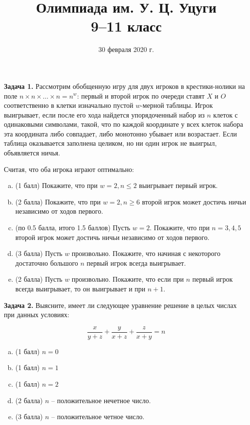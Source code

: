\documentclass[a4paper]{article}
\title{Олимпиада им. У. Ц. Уцуги \\ \Large 9--11 класс}
\date{30 февраля 2020 г.}
\begin{document}
	\maketitle

	\textbf{Задача 1.} Рассмотрим обобщенную игру для двух игроков в крестики-нолики на поле $n \times n \times \dots \times n = n^w$: первый и второй игрок по очереди ставят $X$ и $O$ соответственно в клетки изначально пустой $w$-мерной таблицы. Игрок выигрывает, если после его хода найдется упорядоченный набор из $n$ клеток с одинаковыми символами, такой, что по каждой координате у всех клеток набора эта координата либо совпадает, либо монотонно убывает или возрастает. Если таблица оказывается заполнена целиком, но ни один игрок не выигрыл, объявляется ничья.

	Считая, что оба игрока играют оптимально:

	\begin{enumerate}[a)]
		\item (1 балл) Покажите, что при $w = 2, n \le 2$ выигрывает первый игрок.
		\item (2 балла) Покажите, что при $w = 2, n \ge 6$ второй игрок может достичь ничьи независимо от ходов первого.
		\item (по 0.5 балла, итого 1.5 баллов) Пусть $w = 2$. Покажите, что при $n = 3, 4, 5$ второй игрок может достичь ничьи независимо от ходов первого.
		\item (3 балла) Пусть $w$ произвольно. Покажите, что начиная с некоторого достаточно большого $n$ первый игрок всегда выигрывает.
		\item (2 балла) Пусть $w$ произвольно. Покажите, что если при $n$ первый игрок всегда выигрывает, то он выигрывает и при $n+1$.
	\end{enumerate}


	\textbf{Задача 2.} Выясните, имеет ли следующее уравнение решение в целых числах при данных условиях:

	\begin{equation*}
		\frac{x}{y + z} + \frac{y}{x + z} + \frac{z}{x + y} = n
	\end{equation*}

	\begin{enumerate}[a)]
		\item (1 балл) $n = 0$
		\item (1 балл) $n = 1$
		\item (1 балл) $n = 2$
		\item (2 балла) $n$ -- положительное нечетное число.
		\item (3 балла) $n$ -- положительное четное число.
	\end{enumerate}
\end{document}
